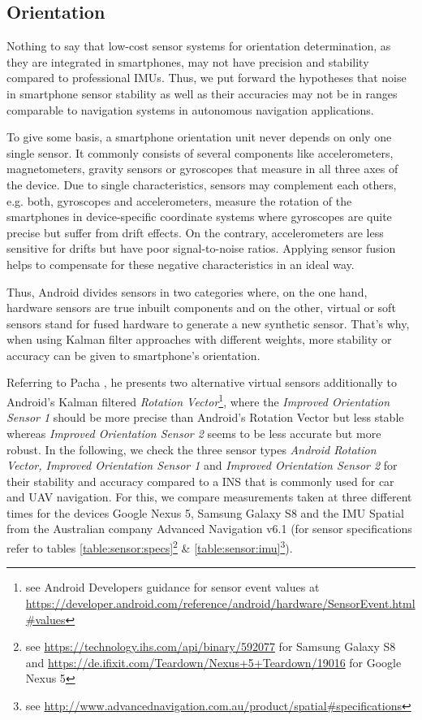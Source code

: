\documentclass[review]{elsarticle}
\begin{document}
\subsection{Orientation}
\label{sec:technology:sensors:orientation}

Nothing to say that low-cost sensor systems for orientation determination, as they are integrated in smartphones, may not have precision and stability compared to professional \glspl{IMU}. Thus, we put forward the hypotheses that noise in smartphone sensor stability as well as their accuracies may not be in ranges comparable to navigation systems in autonomous navigation applications.

To give some basis, a smartphone orientation unit never depends on only one single sensor. It commonly consists of several components like accelerometers, magnetometers, gravity sensors or gyroscopes that measure in all three axes of the device. Due to single characteristics, sensors may complement each others, e.g. both, gyroscopes and accelerometers, measure the rotation of the smartphones in device-specific coordinate systems where gyroscopes are quite precise but suffer from drift effects. On the contrary, accelerometers are less sensitive for drifts but have poor signal-to-noise ratios. Applying sensor fusion helps to compensate for these negative characteristics in an ideal way. 

Thus, Android divides sensors in two categories where, on the one hand, hardware sensors are true inbuilt components and on the other, virtual or soft sensors stand for fused hardware to generate a new synthetic sensor. That's why, when using Kalman filter approaches with different weights, more stability or accuracy can be given to smartphone's orientation. 

Referring to Pacha \cite{Pacha2015}, he presents two alternative virtual sensors additionally to Android's Kalman filtered \textit{Rotation Vector}\footnote{see Android Developers guidance for sensor event values at \url{https://developer.android.com/reference/android/hardware/SensorEvent.html\#values}}, where the \textit{Improved Orientation Sensor 1} should be more precise than Android's Rotation Vector but less stable whereas \textit{Improved Orientation Sensor 2} seems to be less accurate but more robust. In the following, we check the three sensor types \textit{Android Rotation Vector, Improved Orientation Sensor 1} and \textit{Improved Orientation Sensor 2} for their stability and accuracy compared to a \gls{INS} that is commonly used for car and \gls{UAV} navigation. For this, we compare measurements taken at three different times for the devices Google Nexus 5, Samsung Galaxy S8 and the \gls{IMU} Spatial from the Australian company Advanced Navigation v6.1 (for sensor specifications refer to tables \ref{table:sensor:specs}\footnote{see \url{https://technology.ihs.com/api/binary/592077} for Samsung Galaxy S8 and \url{https://de.ifixit.com/Teardown/Nexus+5+Teardown/19016} for Google Nexus 5} \& \ref{table:sensor:imu}\footnote{see \url{http://www.advancednavigation.com.au/product/spatial\#specifications}}). 
\end{document}
